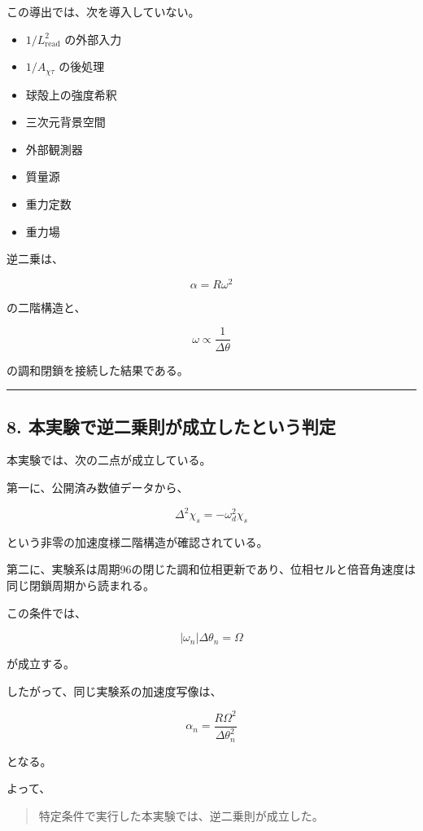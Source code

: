 \documentclass[
  a4paper,
]{ltjsarticle}
\providecommand{\tightlist}{%
  \setlength{\itemsep}{0pt}\setlength{\parskip}{0pt}}
\begin{document}
この導出では、次を導入していない。

\begin{itemize}
\tightlist
\item
  \(1/L_{\mathrm{read}}^2\) の外部入力
\item
  \(1/A_{\chi\tau}\) の後処理
\item
  球殻上の強度希釈
\item
  三次元背景空間
\item
  外部観測器
\item
  質量源
\item
  重力定数
\item
  重力場
\end{itemize}

逆二乗は、

\[
\alpha=R\omega^2
\]

の二階構造と、

\[
\omega\propto\frac{1}{\Delta\theta}
\]

の調和閉鎖を接続した結果である。

\begin{center}\rule{0.5\linewidth}{0.5pt}\end{center}

\subsection{8.
本実験で逆二乗則が成立したという判定}\label{ux672cux5b9fux9a13ux3067ux9006ux4e8cux4e57ux5247ux304cux6210ux7acbux3057ux305fux3068ux3044ux3046ux5224ux5b9a}

本実験では、次の二点が成立している。

第一に、公開済み数値データから、

\[
\Delta^2\chi_s
=-\omega_d^2\chi_s
\]

という非零の加速度様二階構造が確認されている。

第二に、実験系は周期96の閉じた調和位相更新であり、位相セルと倍音角速度は同じ閉鎖周期から読まれる。

この条件では、

\[
|\omega_n|\Delta\theta_n=\Omega
\]

が成立する。

したがって、同じ実験系の加速度写像は、

\[
\alpha_n
=\frac{R\Omega^2}{\Delta\theta_n^2}
\]

となる。

よって、

\begin{quote}
特定条件で実行した本実験では、逆二乗則が成立した。
\end{quote}
\end{document}
